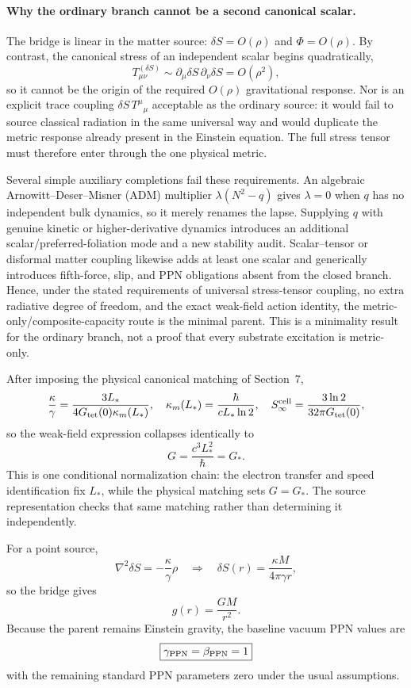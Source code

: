 \documentclass[11pt]{article}
\begin{document}
\paragraph{Why the ordinary branch cannot be a second canonical scalar.}
The bridge is linear in the matter source: $\delta S=O(\rho)$ and $\Phi=O(\rho)$. By contrast, the canonical stress of an independent scalar begins quadratically,
\[
T_{\mu\nu}^{(\delta S)}\sim
\partial_\mu\delta S\,\partial_\nu\delta S=O(\rho^2),
\]
so it cannot be the origin of the required $O(\rho)$ gravitational response. Nor is an explicit trace coupling $\delta S\,T^\mu{}_{\mu}$ acceptable as the ordinary source: it would fail to source classical radiation in the same universal way and would duplicate the metric response already present in the Einstein equation. The full stress tensor must therefore enter through the one physical metric.

Several simple auxiliary completions fail these requirements. An algebraic Arnowitt--Deser--Misner (ADM) multiplier $\lambda(N^2-q)$ gives $\lambda=0$ when $q$ has no independent bulk dynamics, so it merely renames the lapse. Supplying $q$ with genuine kinetic or higher-derivative dynamics introduces an additional scalar/preferred-foliation mode and a new stability audit. Scalar--tensor or disformal matter coupling likewise adds at least one scalar and generically introduces fifth-force, slip, and PPN obligations absent from the closed branch. Hence, under the stated requirements of universal stress-tensor coupling, no extra radiative degree of freedom, and the exact weak-field action identity, the metric-only/composite-capacity route is the minimal parent. This is a minimality result for the ordinary branch, not a proof that every substrate excitation is metric-only.

After imposing the physical canonical matching of Section~7,
\[
\frac{\kappa}{\gamma}
=\frac{3L_*}{4G_{\rm tet}(0)\kappa_m(L_*)},
\quad
\kappa_m(L_*)=\frac{\hbar}{cL_*\ln2},
\quad
S_\infty^{\rm cell}=\frac{3\ln2}{32\pi G_{\rm tet}(0)},
\]
so the weak-field expression collapses identically to
\[
\boxed{
G=\frac{c^3L_*^2}{\hbar}=G_*.
}
\]
This is one conditional normalization chain: the electron transfer and speed identification fix $L_*$, while the physical matching sets $G=G_*$. The source representation checks that same matching rather than determining it independently.

For a point source,
\[
\nabla^2\delta S=-\frac{\kappa}{\gamma}\rho
\quad\Rightarrow\quad
\delta S(r)=\frac{\kappa M}{4\pi\gamma r},
\]
so the bridge gives
\[
\boxed{g(r)=\frac{GM}{r^2}}.
\]
Because the parent remains Einstein gravity, the baseline vacuum PPN values are
\[
\boxed{\gamma_{\rm PPN}=\beta_{\rm PPN}=1}
\]
with the remaining standard PPN parameters zero under the usual assumptions.
\end{document}
